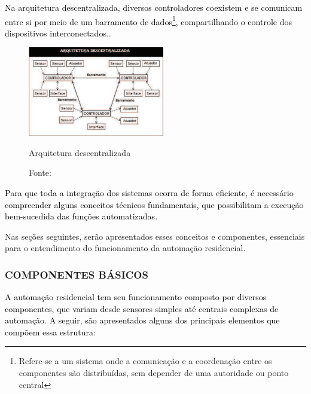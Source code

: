        \textcolor{black}{Na arquitetura descentralizada, diversos controladores coexistem e se comunicam entre si por meio de um barramento de dados\footnote{Refere-se a um sistema onde a comunicação e a coordenação entre os componentes são distribuídas, sem depender de uma autoridade ou ponto central}, compartilhando o controle dos dispositivos interconectados..}

        \begin{figure}[H]
                \centering
                \caption{ }  
                \centering
                \label{fig:cont}
                \includegraphics[width=0.53\textwidth]{imagens/arquiteturaDescentralizada.png}
                \caption*{Arquitetura descentralizada}
                \caption*{Fonte: \cite{hipolito2018automaccao}}
         \end{figure}

       \textcolor{black}{Para que toda a integração dos sistemas ocorra de forma eficiente, é necessário compreender alguns conceitos técnicos fundamentais, que possibilitam a execução bem-sucedida das funções automatizadas.}

       Nas seções seguintes, serão apresentados esses conceitos e componentes, essenciais para o entendimento do funcionamento da automação residencial.

       \subsubsection{COMPONENTES BÁSICOS}

        \textcolor{black}{A automação residencial tem seu funcionamento composto por diversos componentes, que variam desde sensores simples até centrais complexas de automação. A seguir, são apresentados alguns dos principais elementos que compõem essa estrutura:}

